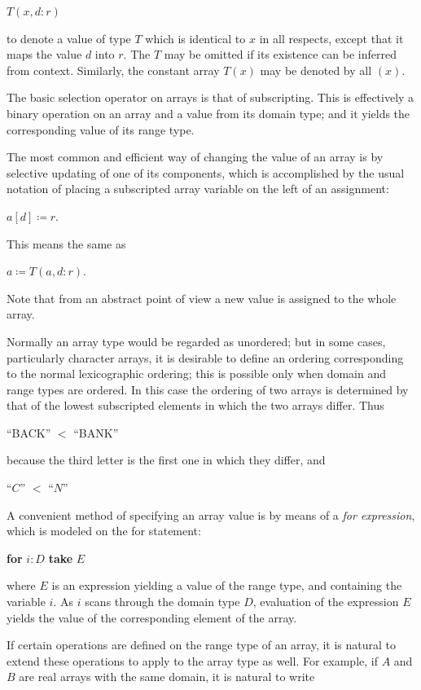 \documentclass[twoside,11pt]{book}
\begin{document}
\quad $T(x, d:r)$

\noindent
to denote a value of type $T$ which is identical to $x$ in all respects, except that it maps the value $d$ into $r$. The $T$ may be omitted if its existence can be inferred from context. Similarly, the constant array $T(x)$ may be denoted by all $(x)$.

The basic selection operator on arrays is that of subscripting. This is effectively a binary operation on an array and a value from its domain type; and it yields the corresponding value of its range type.

The most common and efficient way of changing the value of an array is by selective updating of one of its components, which is accomplished by the usual notation of placing a subscripted array variable on the left of an assignment:

\quad $a[d]\coloneq r.$

\noindent
This means the same as

\quad $a\coloneq T(a, d:r).$

\noindent
Note that from an abstract point of view a new value is assigned to the whole array.

Normally an array type would be regarded as unordered; but in some cases, particularly character arrays, it is desirable to define an ordering corresponding to the normal lexicographic ordering; this is possible only when domain and range types are ordered. In this case the ordering of two arrays is determined by that of the lowest subscripted elements in which the two arrays differ. Thus

\quad ``BACK'' $<$ ``BANK''

\noindent
because the third letter is the first one in which they differ, and

\quad ``$C$'' $<$ ``$N$''

A convenient method of specifying an array value is by means of a \textit{for expression}, which is modeled on the for statement:

\quad \textbf{for} $i:D$ \textbf{take} $E$

\noindent
where $E$ is an expression yielding a value of the range type, and containing the variable $i$. As $i$ scans through the domain type $D$, evaluation of the expression $E$ yields the value of the corresponding element of the array.

If certain operations are defined on the range type of an array, it is natural to extend these operations to apply to the array type as well. For example, if $A$ and $B$ are real arrays with the same domain, it is natural to write
\end{document}

